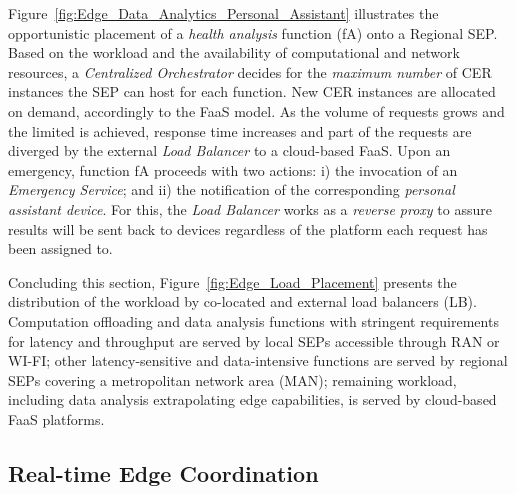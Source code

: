 Figure~\ref{fig:Edge_Data_Analytics_Personal_Assistant} illustrates the opportunistic placement of a \textit{health analysis} function (fA) onto a Regional SEP. Based on the workload and the availability of computational and network resources, a \textit{Centralized Orchestrator} decides for the \textit{maximum number} of CER instances the SEP can host for each function.
New CER instances are allocated on demand, accordingly to the FaaS model. As the volume of requests grows and the limited is achieved, response time increases and part of the requests are diverged
by the external \textit{Load Balancer} to a cloud-based FaaS.
%
Upon an emergency, function fA proceeds with two actions: i) the invocation of an 
\textit{Emergency Service}; and ii) the notification of the corresponding \textit{personal assistant device}. For this, the \textit{Load Balancer} works as a \textit{reverse proxy} to assure results will be sent back to devices regardless of the platform each request has been assigned to.

Concluding this section, Figure~\ref{fig:Edge_Load_Placement} presents the distribution of the workload by co-located and external load balancers (LB). Computation offloading and data analysis functions with stringent requirements for latency and throughput are served by local SEPs accessible through RAN or WI-FI;
other latency-sensitive and data-intensive functions are served by regional SEPs covering a metropolitan network area (MAN); 
remaining workload, including data analysis extrapolating edge capabilities, is served by cloud-based FaaS platforms. 








\subsection{Real-time Edge Coordination}\label{sec:SEP_RTEC}

